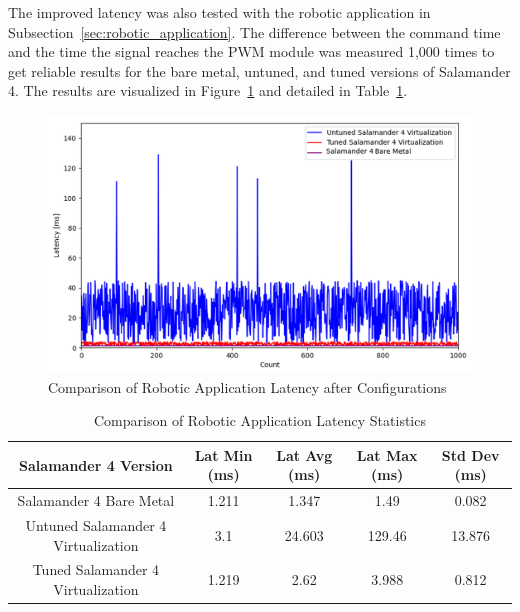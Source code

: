 \documentclass[MMR,Master,english]{style/twbook}
\begin{document}
\clearpage

\noindent The improved latency was also tested with the robotic application in Subsection~\ref{sec:robotic_application}. The difference between the command time and the time the signal reaches the PWM module was measured 1,000 times to get reliable results for the bare metal, untuned, and tuned versions of Salamander 4. The results are visualized in Figure~\ref{fig:combined_latencies} and detailed in Table~\ref{tab:robotic_application_latency_values_combined}.

\begin{figure}[H]
	\centering
	\includegraphics[width=1.0\columnwidth]{img/results/combined_latencies.png}
	\caption{Comparison of Robotic Application Latency after Configurations}
	\label{fig:combined_latencies}
\end{figure}

\begin{table}[H]
	\small
	\centering
	\caption{Comparison of Robotic Application Latency Statistics}
	\label{tab:robotic_application_latency_values_combined}
	\setlength{\tabcolsep}{0.5em} %
	{\renewcommand{\arraystretch}{1.2}%
		\begin{tabular}{|c|c|c|c|c|}
			\hline
			\textbf{Salamander 4 Version}        & \textbf{Lat Min (ms)} & \textbf{Lat Avg (ms)} & \textbf{Lat Max (ms)} & \textbf{Std Dev (ms)} \\ \hline
			Salamander 4 Bare Metal              & 1.211                 & 1.347                 & 1.49                  & 0.082                 \\ \hline
			Untuned Salamander 4 Virtualization & 3.1                   & 24.603                & 129.46                & 13.876                \\ \hline
			Tuned Salamander 4 Virtualization   & 1.219                 & 2.62                  & 3.988                 & 0.812                 \\ \hline
		\end{tabular}}
\end{table}
\end{document}
